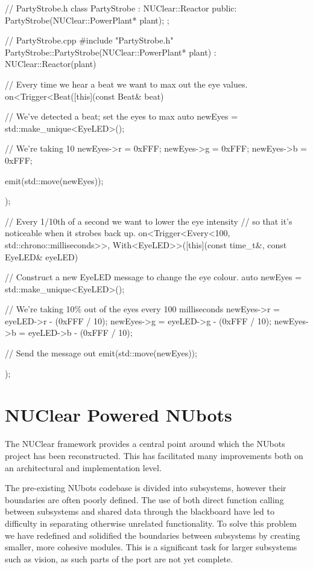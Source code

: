 \documentclass[english,12pt]{scrartcl}
\begin{document}
			\begin{cppcode}
				// PartyStrobe.h
				class PartyStrobe : NUClear::Reactor {
				    public:
				        PartyStrobe(NUClear::PowerPlant* plant);
				};

				// PartyStrobe.cpp
				#include "PartyStrobe.h"
				PartyStrobe::PartyStrobe(NUClear::PowerPlant* plant)
				: NUClear::Reactor(plant) {
				    // Every time we hear a beat we want to max out the eye values.
				    on<Trigger<Beat([this](const Beat& beat) {
				        // We've detected a beat; set the eyes to max
				        auto newEyes = std::make_unique<EyeLED>();

				        // We're taking 10%
				        newEyes->r = 0xFFF;
				        newEyes->g = 0xFFF;
				        newEyes->b = 0xFFF;

				        emit(std::move(newEyes));
				    });

				    // Every 1/10th of a second we want to lower the eye intensity
				    // so that it's noticeable when it strobes back up.
				    on<Trigger<Every<100, std::chrono::milliseconds>>,
				       With<EyeLED>>([this](const time_t&, const EyeLED& eyeLED) {
				        // Construct a new EyeLED message to change the eye colour.
				        auto newEyes = std::make_unique<EyeLED>();

				        // We're taking 10\% out of the eyes every 100 milliseconds
				        newEyes->r = eyeLED->r - (0xFFF / 10);
				        newEyes->g = eyeLED->g - (0xFFF / 10);
				        newEyes->b = eyeLED->b - (0xFFF / 10);

				         // Send the message out
				         emit(std::move(newEyes));
				    });
				}
			\end{cppcode}

	\section{NUClear Powered NUbots}
		The NUClear framework provides a central point around which the NUbots project has been
		reconstructed. This has facilitated many improvements both on an architectural and
		implementation level.

		The pre-existing NUbots codebase is divided into subsystems, however their boundaries are
		often poorly defined. The use of both direct function calling between subsystems and
		shared data through the blackboard have led to difficulty in separating otherwise
		unrelated functionality. To solve this problem we have redefined and solidified the
		boundaries between subsystems by creating smaller, more cohesive modules. This is a
		significant task for larger subsystems such as vision, as such parts of the port are
		not yet complete.
\end{document}
